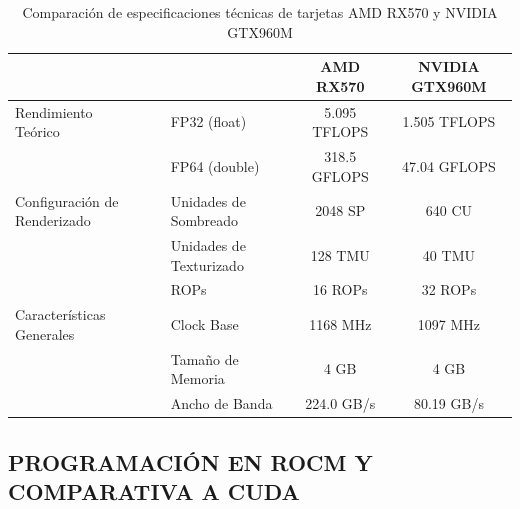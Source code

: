 \begin{table}[h!]
\centering
\begin{tabular}{ll|c|c|}
\cline{3-4}
                                                  &                         & AMD RX570    & NVIDIA GTX960M \\ \hline
\multicolumn{1}{|l}{Rendimiento \newline Teórico}          & FP32 (float)            & 5.095 TFLOPS & 1.505 TFLOPS   \\
\multicolumn{1}{|l}{}                             & FP64 (double)           & 318.5 GFLOPS & 47.04 GFLOPS   \\ \hline 
\multicolumn{1}{|l}{Configuración de Renderizado} & Unidades de Sombreado   & 2048 SP      & 640 CU         \\
\multicolumn{1}{|l}{}                             & Unidades de Texturizado & 128 TMU      & 40 TMU         \\
\multicolumn{1}{|l}{}                             & ROPs                    & 16 ROPs      & 32 ROPs        \\ \hline
\multicolumn{1}{|l}{Características Generales}                      & Clock Base              & 1168 MHz     & 1097 MHz       \\
\multicolumn{1}{|l}{}                             & Tamaño de Memoria       & 4 GB         & 4 GB           \\
\multicolumn{1}{|l}{}                             & Ancho de Banda          & 224.0 GB/s   & 80.19 GB/s     \\ \hline
\end{tabular}
\caption{Comparación de especificaciones técnicas de tarjetas AMD RX570 y NVIDIA GTX960M}
\end{table}

\fi

\subsection{PROGRAMACIÓN EN ROCM Y COMPARATIVA A CUDA}


